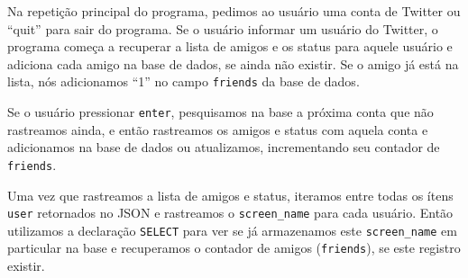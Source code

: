 
Na repetição principal do programa, pedimos ao usuário uma conta de Twitter
ou ``quit'' para sair do programa. Se o usuário informar um usuário do Twitter,
o programa começa a recuperar a lista de amigos e os status para aquele
usuário e adiciona cada amigo na base de dados, se ainda não existir. Se o amigo já
está na lista, nós adicionamos ``1'' no campo {\tt friends} da base de dados.



Se o usuário pressionar {\tt enter}, pesquisamos na base a próxima conta que
não rastreamos ainda, e então rastreamos os amigos e status com aquela conta
e adicionamos na base de dados ou atualizamos, incrementando seu contador de
{\tt friends}.


Uma vez que rastreamos a lista de amigos e status, iteramos entre todas os
ítens {\tt user} retornados no JSON e rastreamos o  \verb"screen_name" para
cada usuário. Então utilizamos a declaração {\tt SELECT} para ver se já
armazenamos este \verb"screen_name" em particular na base e recuperamos o
contador de amigos ({\tt friends}), se este registro existir.

